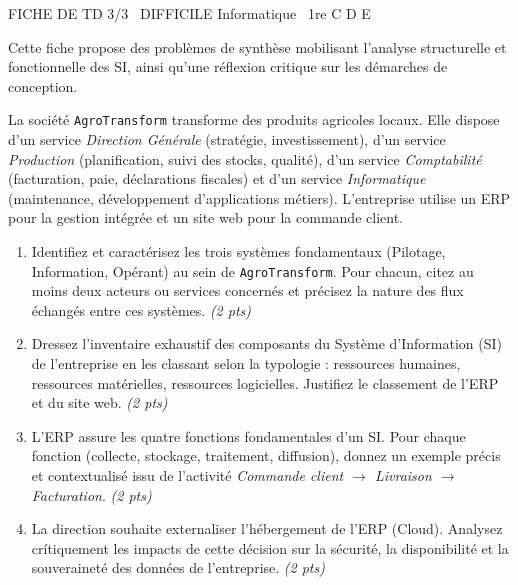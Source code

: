 \documentclass[11pt]{article}
\begin{document}
\begin{tcolorbox}[enhanced,colback=popink,colframe=popink,arc=10pt,boxrule=0pt,left=12pt,right=12pt,top=9pt,bottom=9pt]
{\color{white}\popxbold\small FICHE DE TD 3/3 \textbullet\ DIFFICILE \hfill Informatique \textbullet\ 1re C D E\par}
\end{tcolorbox}
\vspace{4pt}
Cette fiche propose des problèmes de synthèse mobilisant l'analyse structurelle et fonctionnelle des SI, ainsi qu'une réflexion critique sur les démarches de conception.

\begin{exercice}
\label{exo:analyse_struct}
La société \texttt{AgroTransform} transforme des produits agricoles locaux. Elle dispose d'un service \textit{Direction Générale} (stratégie, investissement), d'un service \textit{Production} (planification, suivi des stocks, qualité), d'un service \textit{Comptabilité} (facturation, paie, déclarations fiscales) et d'un service \textit{Informatique} (maintenance, développement d'applications métiers). L'entreprise utilise un ERP pour la gestion intégrée et un site web pour la commande client.
\begin{enumerate}
    \item Identifiez et caractérisez les trois systèmes fondamentaux (Pilotage, Information, Opérant) au sein de \texttt{AgroTransform}. Pour chacun, citez au moins deux acteurs ou services concernés et précisez la nature des flux échangés entre ces systèmes. \textit{(2 pts)}
    \item Dressez l'inventaire exhaustif des composants du Système d'Information (SI) de l'entreprise en les classant selon la typologie : ressources humaines, ressources matérielles, ressources logicielles. Justifiez le classement de l'ERP et du site web. \textit{(2 pts)}
    \item L'ERP assure les quatre fonctions fondamentales d'un SI. Pour chaque fonction (collecte, stockage, traitement, diffusion), donnez un exemple précis et contextualisé issu de l'activité \textit{Commande client $\to$ Livraison $\to$ Facturation}. \textit{(2 pts)}
    \item La direction souhaite externaliser l'hébergement de l'ERP (Cloud). Analysez crítiquement les impacts de cette décision sur la sécurité, la disponibilité et la souveraineté des données de l'entreprise. \textit{(2 pts)}
\end{enumerate}
\end{exercice}
\end{document}
